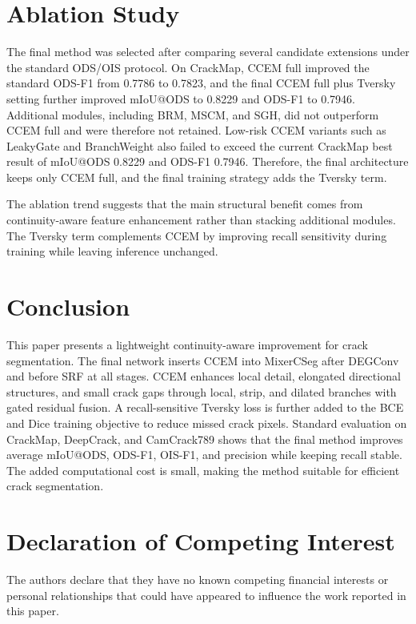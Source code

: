 \documentclass[preprint,12pt]{elsarticle}
\begin{document}
\section{Ablation Study}
\label{sec:ablation}

The final method was selected after comparing several candidate extensions under the standard ODS/OIS protocol. On CrackMap, CCEM full improved the standard ODS-F1 from 0.7786 to 0.7823, and the final CCEM full plus Tversky setting further improved mIoU@ODS to 0.8229 and ODS-F1 to 0.7946. Additional modules, including BRM, MSCM, and SGH, did not outperform CCEM full and were therefore not retained. Low-risk CCEM variants such as LeakyGate and BranchWeight also failed to exceed the current CrackMap best result of mIoU@ODS 0.8229 and ODS-F1 0.7946. Therefore, the final architecture keeps only CCEM full, and the final training strategy adds the Tversky term.

The ablation trend suggests that the main structural benefit comes from continuity-aware feature enhancement rather than stacking additional modules. The Tversky term complements CCEM by improving recall sensitivity during training while leaving inference unchanged.

\section{Conclusion}
\label{sec:conclusion}

This paper presents a lightweight continuity-aware improvement for crack segmentation. The final network inserts CCEM into MixerCSeg after DEGConv and before SRF at all stages. CCEM enhances local detail, elongated directional structures, and small crack gaps through local, strip, and dilated branches with gated residual fusion. A recall-sensitive Tversky loss is further added to the BCE and Dice training objective to reduce missed crack pixels. Standard evaluation on CrackMap, DeepCrack, and CamCrack789 shows that the final method improves average mIoU@ODS, ODS-F1, OIS-F1, and precision while keeping recall stable. The added computational cost is small, making the method suitable for efficient crack segmentation.

\section*{Declaration of Competing Interest}

The authors declare that they have no known competing financial interests or personal relationships that could have appeared to influence the work reported in this paper.
\end{document}
